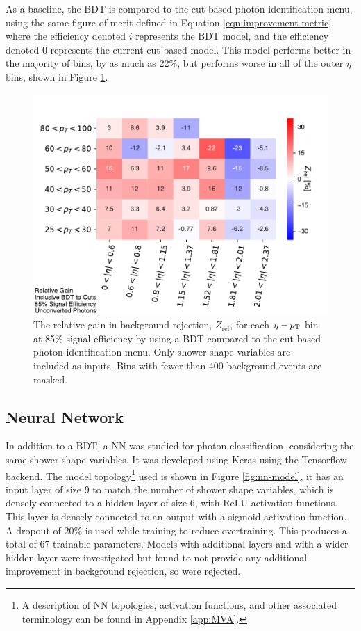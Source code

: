 As a baseline, the \gls{BDT} is compared to the cut-based photon identification menu, using the same figure of merit defined in Equation \ref{eqn:improvement-metric}, where the efficiency denoted $i$ represents the \gls{BDT} model, and the efficiency denoted $0$ represents the current cut-based model. This model performs better in the majority of bins, by as much as 22\%, but performs worse in all of the outer $\eta$ bins, shown in Figure \ref{fig:gain-bdt-vs-cuts}.
\begin{figure}[!htb]
    \centering
    \includegraphics[width=.85\textwidth]{chapters/chapter4_photonID/images/gain_BDTinclusive_cuts_unconverted.pdf}
    \caption[The relative gain in background rejection, $Z_{\text{rel}}$, for each $\eta-\pt$ bin at 85\% signal efficiency by using a \gls{BDT} compared to the cut-based photon identification menu]
    {The relative gain in background rejection, $Z_{\text{rel}}$, for each $\eta-\pt$ bin at 85\% signal efficiency by using a \gls{BDT} compared to the cut-based photon identification menu. Only shower-shape variables are included as inputs. Bins with fewer than 400 background events are masked.}
    \label{fig:gain-bdt-vs-cuts}
\end{figure}


\subsection{Neural Network}\label{ssec:yid-nn}

In addition to a \gls{BDT}, a \gls{NN} was studied for photon classification, considering the same shower shape variables. It was developed using Keras \cite{Keras} using the Tensorflow \cite{Tensorflow} backend. The model topology\footnote{A description of \gls{NN} topologies, activation functions, and other associated terminology can be found in Appendix \ref{app:MVA}.} used is shown in Figure \ref{fig:nn-model}, it has an input layer of size 9 to match the number of shower shape variables, which is densely connected to a hidden layer of size 6, with ReLU activation functions. This layer is densely connected to an output with a sigmoid activation function. A dropout \cite{dropout} of 20\% is used while training to reduce overtraining. This produces a total of 67 trainable parameters. Models with additional layers and with a wider hidden layer were investigated but found to not provide any additional improvement in background rejection, so were rejected.

